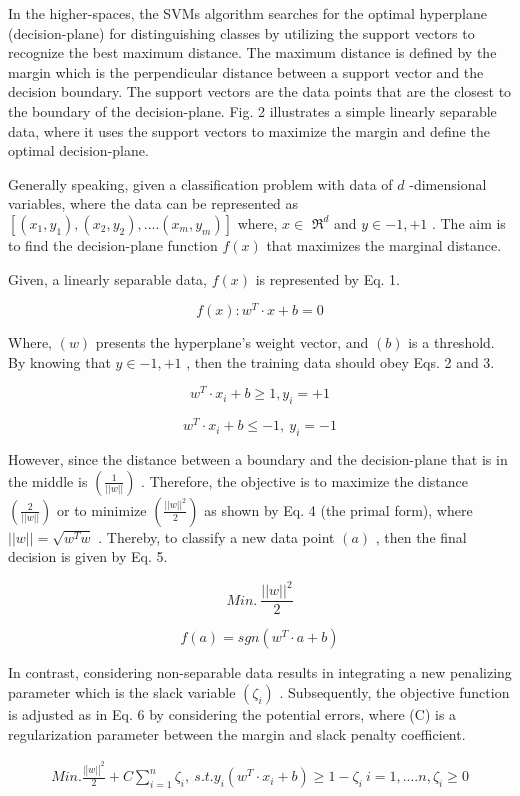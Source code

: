\documentclass{article}
\begin{document}
In the higher-spaces, the SVMs algorithm searches for the optimal hyperplane (decision-plane) for distinguishing classes by utilizing the support vectors to recognize the best maximum distance. The maximum distance is defined by the margin which is the perpendicular distance between a support vector and the decision boundary. The support vectors are the data points that are the closest to the boundary of the decision-plane. Fig. 2 illustrates a simple linearly separable data, where it uses the support vectors to maximize the margin and define the optimal decision-plane.


Generally speaking, given a classification problem with data of $d$ -dimensional variables, where the data can be represented as $[(x_{1},y_{1}),(x_{2},y_{2}),....(x_{m},y_{m})]$ where, $x\in$ $\Re^{d}$ and $y\in{-1,+1}$ . The aim is to find the decision-plane function $f(x)$ that maximizes the marginal distance.


Given, a linearly separable data, $f(x)$ is represented by Eq. 1.


$$ f(x):w^{T}\cdot x+b=0 $$


Where, $(w)$ presents the hyperplane’s weight vector, and $(b)$ is a threshold. By knowing that $y\in{-1,+1}$ , then the training data should obey Eqs. 2 and 3.


$$ w^{T}\cdot x_{i}+b\geq1,y_{i}=+1 $$


$$ w^{T}\cdot x_{i}+b\leq-1,~y_{i}=-1 $$


However, since the distance between a boundary and the decision-plane that is in the middle is $\left({\frac{1}{\left|\left|w\right|\right|}}\right)$ . Therefore, the objective is to maximize the distance $\left({\frac{2}{\left|\left|w\right|\right|}}\right)$ or to minimize $\left({\frac{||w||^{2}}{2}}\right)$ as shown by Eq. 4 (the primal form), where $||w||=\sqrt{w^{T}w}$ . Thereby, to classify a new data point $(a)$ , then the final decision is given by Eq. 5.


$$ M i n.~\frac{||w||^{2}}{2} $$


$$ f(a)=s g n(w^{T}\cdot a+b) $$


In contrast, considering non-separable data results in integrating a new penalizing parameter which is the slack variable $(\zeta_{i})$ . Subsequently, the objective function is adjusted as in Eq. 6 by considering the potential errors, where (C) is a regularization parameter between the margin and slack penalty coefficient.


$$ \begin{array}{c}{{M i n.\frac{\lvert|w\rvert|^{2}}{2}+C\displaystyle\sum_{i=1}^{n}\zeta_{i},}}\ {{s.t.y_{i}(w^{T}\cdot x_{i}+b)\geq1-\zeta_{i}}}\ {{i=1,....n,\zeta_{i}\geq0}}\end{array} $$
\end{document}
